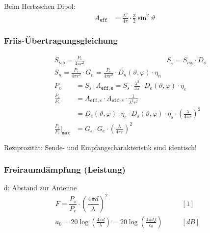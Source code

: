 Beim Hertzschen Dipol:
\begin{align*}
	A_\texttt{eff} & =  \frac{\lambda^2}{4\pi}\cdot\frac{3}{2}\sin^2\vartheta &
\end{align*}

\subsubsection{Friis-Übertragungsgleichung}
\begin{align*}
	 & S_{iso} = \frac{P_s}{4\pi r^2}                                                       & S_s = S_{iso} \cdot D_s                                                  \\
	 & S_n=\frac{P_s}{4\pi r^2}\cdot G_n = \frac{P_s}{4\pi r^2}\cdot D_n(\vartheta, \varphi)\cdot \eta_n                                                                                                              
\end{align*}
\begin{align*}
	P_e                                     & = S_s \cdot A_{\mathtt{eff,e}} = S_s\cdot \frac{\lambda^2}{4\pi}\cdot D_e(\vartheta, \varphi)\cdot \eta_e                                                \\
	\frac{P_{e}}{P_{s}}                     & = A_{\texttt{eff},e}\cdot A_{\texttt{eff},s}\cdot\frac{1}{\lambda^2r^2}                                                    \\
	                                        & = D_e(\vartheta, \varphi)\cdot\eta_{e}\cdot D_s(\vartheta, \varphi)\cdot\eta_{s}\cdot\left(\frac{\lambda}{4\pi r}\right)^2 \\
	\frac{P_{e}}{P_{s}}\Big|_{\mathtt{max}} & = G_{s}\cdot G_{e}\cdot \left(\frac{\lambda}{4\pi r}\right)^2
\end{align*}

Reziprozität: Sende- und Empfangscharakteristik sind identisch!

\subsubsection{Freiraumdämpfung (Leistung)}
d: Abstand zur Antenne
\begin{align*}
	F = \dfrac{P_{s}}{P_{e}} \cdot \left(\dfrac{4 \pi d}{\lambda}\right)^2                             & \qquad [1]       \\
	a_{0} = 20 \log \left(\frac{4 \pi d}{\lambda}\right) =20 \log \left(\frac{4 \pi d f}{c_{0}}\right) & \qquad [\si{dB}]
\end{align*}

